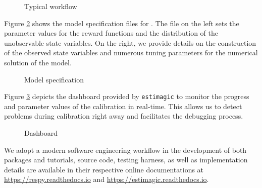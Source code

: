 \begin{figure}[ht!]\centering
\caption{Typical workflow}\label{Typical workflow}

\end{figure}\FloatBarrier

\noindent Figure \ref{Model specification} shows the model specification files for \citet{Keane.1994}. The file on the left sets the parameter values for the reward functions and the distribution of the unobservable state variables. On the right, we provide details on the construction of the observed state variables and numerous tuning parameters for the numerical solution of the model.

\begin{figure}[h!]\centering
\caption{Model specification}\label{Model specification}
\hspace{0.3cm}
\end{figure}\FloatBarrier

\noindent Figure \ref{Dashboard} depicts the dashboard provided by \verb+estimagic+ to monitor the progress and parameter values of the calibration in real-time. This allows us to detect problems during calibration right away and facilitates the debugging process.

\begin{figure}[h!]\centering
\caption{Dashboard}\label{Dashboard}
\end{figure}\FloatBarrier

\noindent We adopt a modern software engineering workflow in the development of both packages and tutorials, source code, testing harness, as well as implementation details are available in their respective online documentations at \url{https://respy.readthedocs.io} and \url{https://estimagic.readthedocs.io}.
